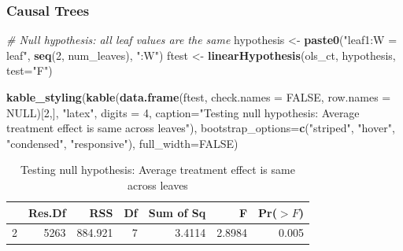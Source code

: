 \documentclass[
  shownotes,
  xcolor={svgnames},
  hyperref={colorlinks,citecolor=DarkBlue,linkcolor=DarkRed,urlcolor=DarkBlue}
  , aspectratio=169]{beamer}
\newenvironment{Shaded}{\begin{snugshade}}{\end{snugshade}}
\newcommand{\CommentTok}[1]{\textcolor[rgb]{0.56,0.35,0.01}{\textit{#1}}}
\newcommand{\DataTypeTok}[1]{\textcolor[rgb]{0.13,0.29,0.53}{#1}}
\newcommand{\DecValTok}[1]{\textcolor[rgb]{0.00,0.00,0.81}{#1}}
\newcommand{\KeywordTok}[1]{\textcolor[rgb]{0.13,0.29,0.53}{\textbf{#1}}}
\newcommand{\NormalTok}[1]{#1}
\newcommand{\OtherTok}[1]{\textcolor[rgb]{0.56,0.35,0.01}{#1}}
\newcommand{\StringTok}[1]{\textcolor[rgb]{0.31,0.60,0.02}{#1}}
\begin{document}
\begin{frame}[fragile]
\frametitle{Causal Trees}

\begin{scriptsize}


\begin{Shaded}
\begin{Highlighting}[]
\CommentTok{\# Null hypothesis: all leaf values are the same}
\NormalTok{hypothesis \textless{}{-}}\StringTok{ }\KeywordTok{paste0}\NormalTok{(}\StringTok{"leaf1:W = leaf"}\NormalTok{, }\KeywordTok{seq}\NormalTok{(}\DecValTok{2}\NormalTok{, num\_leaves), }\StringTok{":W"}\NormalTok{)}
\NormalTok{ftest \textless{}{-}}\StringTok{ }\KeywordTok{linearHypothesis}\NormalTok{(ols\_ct, hypothesis, }\DataTypeTok{test=}\StringTok{"F"}\NormalTok{)}

\KeywordTok{kable\_styling}\NormalTok{(}\KeywordTok{kable}\NormalTok{(}\KeywordTok{data.frame}\NormalTok{(ftest, }\DataTypeTok{check.names =} \OtherTok{FALSE}\NormalTok{, }\DataTypeTok{row.names =} \OtherTok{NULL}\NormalTok{)[}\DecValTok{2}\NormalTok{,],}
                    \StringTok{"latex"}\NormalTok{, }\DataTypeTok{digits =} \DecValTok{4}\NormalTok{,}
                    \DataTypeTok{caption=}\StringTok{"Testing null hypothesis: Average treatment effect is same across leaves"}\NormalTok{),}
              \DataTypeTok{bootstrap\_options=}\KeywordTok{c}\NormalTok{(}\StringTok{"striped"}\NormalTok{, }\StringTok{"hover"}\NormalTok{, }\StringTok{"condensed"}\NormalTok{, }\StringTok{"responsive"}\NormalTok{),}
              \DataTypeTok{full\_width=}\OtherTok{FALSE}\NormalTok{)}
\end{Highlighting}
\end{Shaded}
\end{scriptsize}

\begin{table}

\caption{\label{tab:unnamed-chunk-15}Testing null hypothesis: Average treatment effect is same across leaves}
\centering
\begin{tabular}[t]{l|r|r|r|r|r|r}
\hline
  & Res.Df & RSS & Df & Sum of Sq & F & Pr($>F$)\\
\hline
2 & 5263 & 884.921 & 7 & 3.4114 & 2.8984 & 0.005\\
\hline
\end{tabular}
\end{table}



\end{frame}
\end{document}

